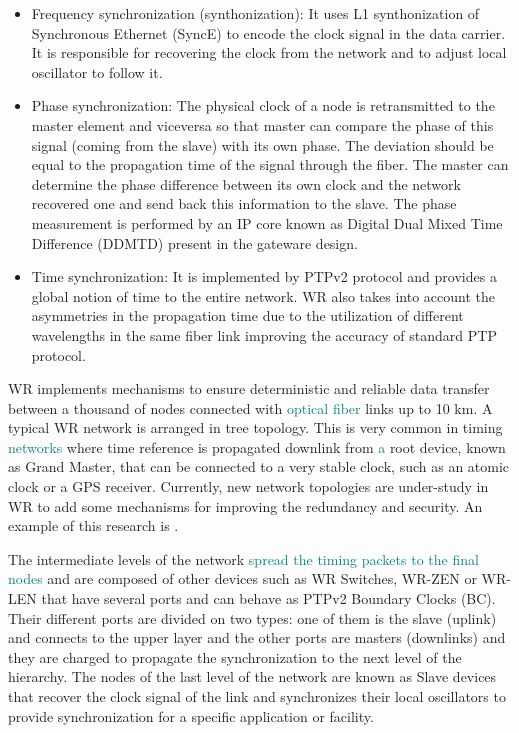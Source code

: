 \begin{itemize}
	\item {Frequency synchronization (synthonization): It uses L1 synthonization of Synchronous Ethernet (SyncE) to encode the clock signal in the data carrier. It is responsible for recovering the clock from the network and to adjust local oscillator to follow it.}
	\item {Phase synchronization: The physical clock of a node is retransmitted to the master element and viceversa so that master can compare the phase of this signal (coming from the slave) with its own phase. The deviation should be equal to the propagation time of the signal through the fiber. The master can determine the phase difference between its own clock and the network recovered one and send back this information to the slave. The phase measurement is performed by an IP core known as Digital Dual Mixed Time Difference (DDMTD) present in the gateware design.}
	\item {Time synchronization: It is implemented by PTPv2 protocol and provides a global notion of time to the entire network. WR also takes into account the asymmetries in the propagation time due to the utilization of different wavelengths in the same fiber link improving the accuracy of standard PTP protocol.}
\end{itemize}


WR implements mechanisms to ensure  deterministic and reliable data transfer between a thousand of nodes connected with  \textcolor{teal}{optical fiber} links up to 10 km. A typical WR network is arranged in tree topology. This is very common in timing \textcolor{teal}{networks} where time reference is propagated downlink from \textcolor{teal}{a} root device, known as Grand Master, that can be connected to a very stable clock, such as an atomic clock or a GPS receiver. Currently, new network topologies are under-study in WR to add some mechanisms for improving the redundancy and security. An example of this research is \cite{jlgutierrez-paper-redundancy}.

The intermediate levels of the network \textcolor{teal}{spread the timing packets to the final nodes} and are composed of other devices such as WR Switches, WR-ZEN or WR-LEN that have several ports and can behave as PTPv2 Boundary Clocks (BC). Their different ports are divided on two types: one of them is the slave (uplink) and connects to the upper layer and the other ports are masters (downlinks) and they are charged to propagate the synchronization to the next level of the hierarchy. The nodes of the last level of the network are known as Slave devices that recover the clock signal of the link and synchronizes their local oscillators to provide synchronization for a specific application or facility.


